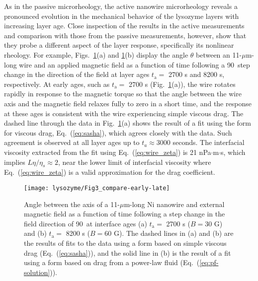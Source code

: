 As in the passive microrheology, the active nanowire microrheology reveals a pronounced evolution in the mechanical behavior of the lysozyme layers with increasing layer age.  Close inspection of the results in the active measurements and comparison with those from the passive measurements, however, show that they probe a different aspect of the layer response, specifically its nonlinear rheology.  For example, Figs.~\ref{fig:early-and-late-rotation}(a) and \ref{fig:early-and-late-rotation}(b) display the angle $\theta$ between an 11-$\mu$m-long wire and an applied magnetic field as a function of time following a 90\degree\ step change in the direction of the field at layer ages $t_{\text{a}}=$ 2700 s and 8200 s, respectively.  At early ages, such as $t_{\text{a}}=$ 2700 s (Fig.~\ref{fig:early-and-late-rotation}(a)), the wire rotates rapidly in response to the magnetic torque so that the angle between the wire axis and the magnetic field relaxes fully to zero in a short time, and the response at these ages is consistent with the wire experiencing simple viscous drag.  The dashed line through the data in Fig.~\ref{fig:early-and-late-rotation}(a) shows the result of a fit using the form for viscous drag, Eq.~(\ref{eq:sasha}), which agrees closely with the data.  Such agreement is observed at all layer ages up to $t_a \approx 3000$ seconds.  The interfacial viscosity extracted from the fit using Eq.~(\ref{eq:wire_zeta}) is 21 nPa$\cdot$m$\cdot$s, which implies $L\eta/\eta_s \approx 2$, near the lower limit of interfacial viscosity where Eq.~(\ref{eq:wire_zeta}) is a valid approximation for the drag coefficient. 

\begin{figure}
  \centerline{\texttt{[image: lysozyme/Fig3\_compare-early-late]}}
 \caption{\label{fig:early-and-late-rotation} Angle between the axis of a 11-$\mu$m-long Ni nanowire and external magnetic field as a function of time following a step change in the field direction of 90\degree~at interface ages (a) $t_{\text{a}}=$ 2700 s ($B = 30$ G) and (b) $t_{\text{a}}=$ 8200 s ($B = 60$ G).  The dashed lines in (a) and (b) are the results of fits to the data using a form based on simple viscous drag (Eq.~(\ref{eq:sasha})), and the solid line in (b) is the result of a fit using a form based on drag from a power-law fluid (Eq.~(\ref{eq:pf-solution})).}
\end{figure}

